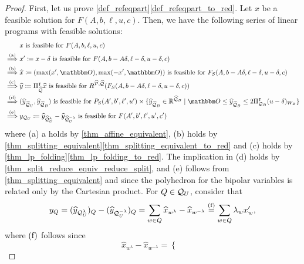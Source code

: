 \documentclass[pdflatex,sn-mathphys-num]{sn-jnl}%
\theoremstyle{thmstyleone}%
\theoremstyle{thmstylethree}%
\theoremstyle{thmstyletwo}%
\begin{document}
\begin{proof}
    First, let us prove \cref{def_refeqpart}\ref{def_refeqpart_to_red}. Let $x$ be a feasible solution for $F(A,b,\ell,u,c)$. Then, we have the following series of linear programs with feasible solutions:
    \begin{align*}
     & x \text{ is feasible for } F(A,b,\ell,u,c)\\ \stackrel{\textup{(a)}}\implies & x' \coloneqq x-\delta  \text{ is feasible for $F(A,b-A\delta, \ell - \delta, u - \delta,c)$} \\\stackrel{\textup{(b)}}\implies & \widehat{x} \coloneqq (\max(x',\zerovec),\max(-x',\zerovec)) \text{ is feasible for }F_S(A,b-A\delta, \ell - \delta, u - \delta,c) \\ \stackrel{\textup{(c)}}\implies & \widehat{y} \coloneqq \transpose{\Pi_{\widehat{\MQ}}} \widehat{x}\text{ is feasible for } R^{\widehat{\MP},\widehat{\MQ}}(F_S(A,b-A\delta, \ell - \delta, u - \delta,c))\\ \stackrel{\textup{(d)}}\implies & (\widehat{y}_{\widehat{\MQ}_U},\widehat{y}_{\widehat{\MQ}_B})\text{ is feasible for } P_S(A',b',\ell',u') \times \{\widehat{y}_{\widehat{\MQ}_B} \in \R^{\widehat{\MQ}_B} \mid \zerovec \leq \widehat{y}_{\widehat{\MQ}_B} \leq 2 \transpose{\Pi_{\MQ_B}} (u - \delta)_{W_B}\}\\
     \stackrel{\textup{(e)}}\implies & y_{\MQ_U} \coloneqq \widehat{y}_{\widehat{\MQ}^{\lambda}_U} - \widehat{y}_{\widehat{\MQ}^{-\lambda}_U} \text{ is feasible for } F(A',b',\ell',u',c')
    \end{align*}
    where \textup{(a)} a holds by \cref{thm_affine_equivalent}, \textup{(b)} holds by \cref{thm_splitting_equivalent}\ref{thm_splitting_equivalent_to_red} and \textup{(c)} holds by \cref{thm_lp_folding}\ref{thm_lp_folding_to_red}. The implication in \textup{(d)} holds by \cref{thm_split_reduce_equiv_reduce_split}, and 
    \textup{(e)} follows from \cref{thm_splitting_equivalent} and since the polyhedron for the bipolar variables is related only by the Cartesian product.
    For $Q\in \mathcal{Q}_U$, consider that 
    \begin{equation*}
     y_Q = (\widehat{y}_{\mathcal{Q}^\lambda_U})_Q - (\widehat{y}_{\mathcal{Q}^{-\lambda}_U})_Q = \sum_{w\in Q} \widehat{x}_{w^\lambda} - \widehat{x}_{w^{-\lambda}} \stackrel{\textup{(f)}}= \sum_{w\in Q} \lambda_w x'_w,  
    \end{equation*}
    where $\textup{(f)}$ follows since 
    \begin{equation*}
       \widehat{x}_{w^\lambda} - \widehat{x}_{w^{-\lambda}} = \begin{cases}

\end{cases}
\end{equation*}
\end{proof}
\end{document}
